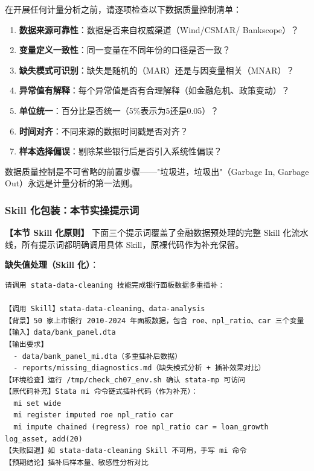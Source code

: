 \begin{theorybox}
在开展任何计量分析之前，请逐项检查以下数据质量控制清单：

\begin{enumerate}[leftmargin=2em]
  \item \textbf{数据来源可靠性}：数据是否来自权威渠道（Wind/CSMAR/ Bankscope）？
  \item \textbf{变量定义一致性}：同一变量在不同年份的口径是否一致？
  \item \textbf{缺失模式可识别}：缺失是随机的（MAR）还是与因变量相关（MNAR）？
  \item \textbf{异常值有解释}：每个异常值是否有合理解释（如金融危机、政策变动）？
  \item \textbf{单位统一}：百分比是否统一（5\%表示为5还是0.05）？
  \item \textbf{时间对齐}：不同来源的数据时间戳是否对齐？
  \item \textbf{样本选择偏误}：剔除某些银行后是否引入系统性偏误？
\end{enumerate}

数据质量控制是不可省略的前置步骤——"垃圾进，垃圾出"（Garbage In, Garbage Out）永远是计量分析的第一法则。
\end{theorybox}

\subsubsection{Skill 化包装：本节实操提示词}

\textbf{【本节 Skill 化原则】} 下面三个提示词覆盖了金融数据预处理的完整 Skill 化流水线，所有提示词都明确调用具体 Skill，原裸代码作为补充保留。

\textbf{缺失值处理（Skill 化）}：
\begin{lstlisting}
请调用 stata-data-cleaning 技能完成银行面板数据多重插补：

【调用 Skill】stata-data-cleaning、data-analysis
【背景】50 家上市银行 2010-2024 年面板数据，包含 roe、npl_ratio、car 三个变量
【输入】data/bank_panel.dta
【输出要求】
  - data/bank_panel_mi.dta（多重插补后数据）
  - reports/missing_diagnostics.md（缺失模式分析 + 插补效果对比）
【环境检查】运行 /tmp/check_ch07_env.sh 确认 stata-mp 可访问
【原代码补充】Stata mi 命令链式插补代码（作为补充）：
  mi set wide
  mi register imputed roe npl_ratio car
  mi impute chained (regress) roe npl_ratio car = loan_growth log_asset, add(20)
【失败回退】如 stata-data-cleaning Skill 不可用，手写 mi 命令
【预期结论】插补后样本量、敏感性分析对比
\end{lstlisting}

